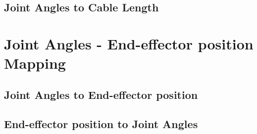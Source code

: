 \documentclass[a4paper,12pt]{report}
\begin{document}
\begin{appendices}
	\subsection{Joint Angles to Cable Length}
	
	
	\section{Joint Angles - End-effector position Mapping}
	\label{appendix:c-b}
	\subsection{Joint Angles to End-effector position}
	
	\subsection{End-effector position to Joint Angles}
	
	
\end{appendices}



\end{document}
